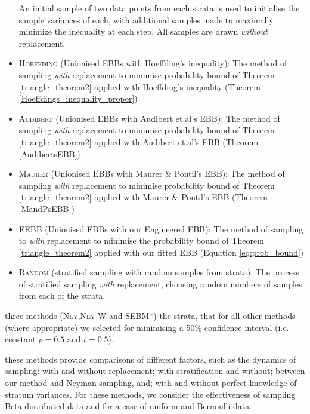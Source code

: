\begin{itemize}
An initial sample of two data points from each strata is used to initialise the sample variances of each, with additional samples made to maximally minimize the inequality at each step. All samples are drawn \textit{without} replacement.
\item \textsc{Hoeffding} (Unionised EBBs with Hoeffding's inequality): The method of sampling \textit{with} replacement to minimise probability bound of Theorem \ref{triangle_theorem2} applied with Hoeffding's inequality (Theorem \ref{Hoeffdings_inequality_proper})
\item \textsc{Audibert} (Unionised EBBs with Audibert et.al's EBB): The method of sampling \textit{with} replacement to minimise probability bound of Theorem \ref{triangle_theorem2} applied with Audibert et.al's EBB (Theorem \ref{AudibertsEBB})
\item \textsc{Maurer} (Unionised EBBs with Maurer \& Pontil's EBB): The method of sampling \textit{with} replacement to minimise probability bound of Theorem \ref{triangle_theorem2} applied with Maurer \& Pontil's EBB (Theorem \ref{MandPsEBB})
\item \textsc{EEBB} (Unionised EBBs with our Engineered EBB): The method of sampling to \textit{with} replacement to minimise the probability bound of Theorem \ref{triangle_theorem2} applied with our fitted EBB (Equation \ref{eq:prob_bound})
\item \textsc{Random} (stratified sampling with random samples from strata): The process of stratified sampling \textit{with} replacement, choosing random numbers of samples from each of the strata.
\end{itemize}
\DIFdelbegin {}\DIFdelend \DIFaddbegin {}\DIFaddend three methods (\textsc{Ney},\textsc{Ney-W} and SEBM*) \DIFdelbegin {}\DIFdelend \DIFaddbegin {}\DIFaddend the strata, \DIFdelbegin {}\DIFdelend \DIFaddbegin {}\DIFaddend that for all other methods (where appropriate) we selected for minimising a 50\% confidence interval (i.e. constant $p=0.5$ and $t=0.5$).

\DIFdelbegin {}\DIFdelend \DIFaddbegin {}\DIFaddend these methods provide comparisons of different \DIFdelbegin {}\DIFdelend \DIFaddbegin {}\DIFaddend factors, such as the dynamics of sampling: with and without replacement; with stratification and without; between our method and Neyman sampling, and; with and without perfect knowledge of stratum variances. 
For these methods, we consider the effectiveness of sampling Beta distributed data and for a case of uniform-and-Bernoulli data.

